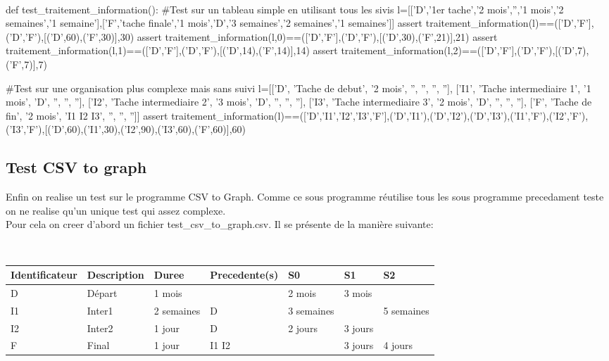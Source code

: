 \documentclass{article}
\begin{document}
\\
\begin{python}
def test_traitement_information():
    #Test sur un tableau simple en utilisant tous les sivis
    l=[['D','1er tache','2 mois','','1 mois','2 semaines','1 semaine'],['F','tache finale','1 mois','D','3 semaines','2 semaines','1 semaines']]
    assert traitement_information(l)==(['D','F'],{('D','F')},[('D',60),('F',30)],30)
    assert traitement_information(l,0)==(['D','F'],{('D','F')},[('D',30),('F',21)],21)
    assert traitement_information(l,1)==(['D','F'],{('D','F')},[('D',14),('F',14)],14)
    assert traitement_information(l,2)==(['D','F'],{('D','F')},[('D',7),('F',7)],7)

    #Test sur une organisation plus complexe mais sans suivi
    l=[['D', 'Tache de debut', '2 mois', '', '', '', ''], ['I1', 'Tache intermediaire 1', '1 mois', 'D', '', '', ''], ['I2', 'Tache intermediaire 2', '3 mois', 'D', '', '', ''], ['I3', 'Tache intermediaire 3', '2 mois', 'D', '', '', ''], ['F', 'Tache de fin', '2 mois', 'I1 I2 I3', '', '', '']]
    assert traitement_information(l)==(['D','I1','I2','I3','F'],{('D','I1'),('D','I2'),('D','I3'),('I1','F'),('I2','F'),('I3','F')},[('D',60),('I1',30),('I2',90),('I3',60),('F',60)],60)
\end{python}

\subsection{Test CSV to graph}
Enfin on realise un test sur le programme CSV to Graph. Comme ce sous programme réutilise tous les sous programme precedament teste on ne realise qu'un unique test qui assez complexe.
\\
Pour cela on creer d'abord un fichier test\_csv\_to\_graph.csv. Il se présente de la manière suivante:

\\
\begin{table}[!ht]
    \centering
    \begin{tabular}{|l|l|l|l|l|l|l|}
    \hline
        Identificateur & Description & Duree & Precedente(s) & S0 & S1 & S2 \\ \hline
        D & Départ & 1 mois & ~ & 2 mois & 3 mois & ~ \\ \hline
        I1 & Inter1 & 2 semaines & D & 3 semaines & ~ & 5 semaines \\ \hline
        I2 & Inter2 & 1 jour & D & 2 jours & 3 jours & ~ \\ \hline
        F & Final & 1 jour & I1 I2 & ~ & 3 jours & 4 jours \\ \hline
    \end{tabular}
\end{table}
\end{document}
